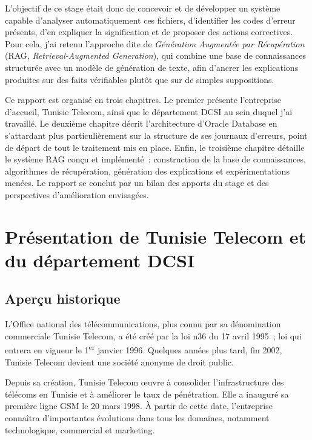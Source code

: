 \documentclass[12pt,a4paper]{report}
\begin{document}
L'objectif de ce stage \'etait donc de concevoir et de d\'evelopper un syst\`eme capable
d'analyser automatiquement ces fichiers, d'identifier les codes d'erreur pr\'esents, d'en
expliquer la signification et de proposer des actions correctives. Pour cela, j'ai retenu
l'approche dite de \emph{G\'en\'eration Augment\'ee par R\'ecup\'eration}
(RAG, \textit{Retrieval-Augmented Generation}), qui combine une base de connaissances
structur\'ee avec un mod\`ele de g\'en\'eration de texte, afin d'ancrer les explications
produites sur des faits v\'erifiables plut\^ot que sur de simples suppositions.

Ce rapport est organis\'e en trois chapitres. Le premier pr\'esente l'entreprise d'accueil,
Tunisie Telecom, ainsi que le d\'epartement DCSI au sein duquel j'ai travaill\'e. Le
deuxi\`eme chapitre d\'ecrit l'architecture d'Oracle Database en s'attardant plus
particuli\`erement sur la structure de ses journaux d'erreurs, point de d\'epart de tout le
traitement mis en place. Enfin, le troisi\`eme chapitre d\'etaille le syst\`eme RAG con\c cu et
impl\'ement\'e~: construction de la base de connaissances, algorithmes de r\'ecup\'eration,
g\'en\'eration des explications et exp\'erimentations men\'ees. Le rapport se conclut par un
bilan des apports du stage et des perspectives d'am\'elioration envisag\'ees.

\chapter{Pr\'esentation de Tunisie Telecom et du d\'epartement DCSI}

\section{Aper\c cu historique}

L'Office national des t\'el\'ecommunications, plus connu par sa d\'enomination commerciale
Tunisie Telecom, a \'et\'e cr\'e\'e par la loi n\textdegree{}36 du 17 avril 1995~; loi qui
entrera en vigueur le 1\textsuperscript{er} janvier 1996. Quelques ann\'ees plus tard, fin
2002, Tunisie Telecom devient une soci\'et\'e anonyme de droit public.

Depuis sa cr\'eation, Tunisie Telecom \oe{}uvre \`a consolider l'infrastructure des
t\'el\'ecoms en Tunisie et \`a am\'eliorer le taux de p\'en\'etration. Elle a inaugur\'e sa
premi\`ere ligne GSM le 20 mars 1998. \`A partir de cette date, l'entreprise conna\^itra
d'importantes \'evolutions dans tous les domaines, notamment technologique, commercial et
marketing.
\end{document}
